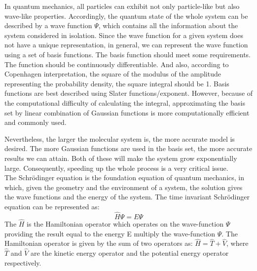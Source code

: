 \documentclass[twoside]{article}
\begin{document}
In quantum mechanics, all particles can exhibit not only particle-like but also wave-like properties. Accordingly, the quantum state of the whole system can be described by a wave function $\Psi$, which contains all the information about the system considered in isolation. Since the wave function for a given system does not have a unique representation, in general, we can represent the wave function using a set of basis functions. The basis function should meet some requirements.  The function should be continuously differentiable. And also, according to Copenhagen interpretation, the square of the modulus of the amplitude representing the probability density, the square integral should be 1. Basis functions are best described using Slater functions/exponent. However, because of the computational difficulty of calculating the integral, approximating the basis set by linear combination of Gaussian functions is more computationally efficient and commonly used. 

Nevertheless, the larger the molecular system is, the more accurate model is desired. The more Gaussian functions are used in the basis set, the more accurate results we can attain. Both of these will make the system grow exponentially large. Consequently, speeding up the whole process is a very critical issue. \\






The Schr\"{o}dinger equation is the foundation equation of quantum mechanics, in which, given the geometry and the environment of a system, the solution gives the wave functions and the energy of the system. 
The time invariant Schr\"{o}dinger equation can be represented as:
\[
				\hat{H}\Psi = E\Psi
\]
The $\hat{H}$ is the Hamiltonian operator which operates on the wave-function $\Psi$ providing the result equal to the energy E multiply the wave-function $\Psi$. The Hamiltonian operator is given by the sum of two operators as: $\hat{H} = \hat{T} + \hat{V}$,  where $\hat{T}$ and $\hat{V}$ are the kinetic energy operator and the potential energy operator respectively.
\end{document}
